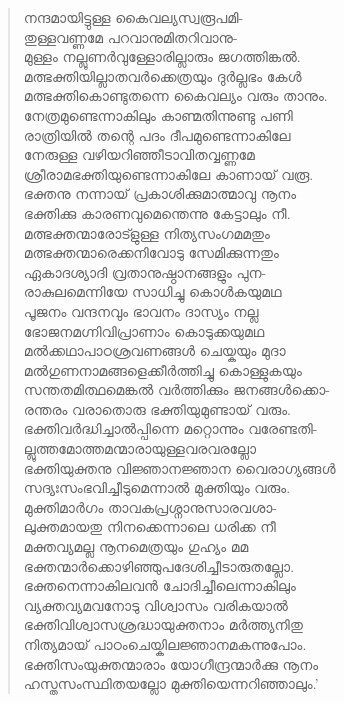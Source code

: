 \begin{verse}
നന്ദമായിട്ടുള്ള കൈവല്യസ്വരൂപമി-\\
തുള്ളവണ്ണമേ പറവാനുമിതറിവാനു-\\
മുള്ളം നല്ലുണര്‍വുള്ളോരില്ലാരും ജഗത്തിങ്കല്‍.\\
മത്ഭക്തിയില്ലാതവര്‍ക്കെത്രയും ദുര്‍ല്ലഭം കേള്‍\\
മത്ഭക്തികൊണ്ടുതന്നെ കൈവല്യം വരും താനും.\\
നേത്രമുണ്ടെന്നാകിലും കാണ്മതിന്നുണ്ടു പണി\\
രാത്രിയില്‍ തന്റെ പദം ദീപമുണ്ടെന്നാകിലേ\\
നേരുള്ള വഴിയറിഞ്ഞീടാവിതവ്വണ്ണമേ\\
ശ്രീരാമഭക്തിയുണ്ടെന്നാകിലേ കാണായ് വരൂ.\\
ഭക്തനു നന്നായ് പ്രകാശിക്കുമാത്മാവു നൂനം\\
ഭക്തിക്കു കാരണവുമെന്തെന്നു കേട്ടാലും നീ.\\
മത്ഭക്തന്മാരോട്ളുള്ള നിത്യസംഗമമതും\\
മത്ഭക്തന്മാരെക്കനിവോടു സേമിക്കുന്നതും\\
ഏകാദശ്യാദി വ്രതാനുഷ്ഠാനങ്ങളും പുന-\\
രാകുലമെന്നിയേ സാധിച്ചു കൊള്‍കയുമഥ\\
പൂജനം വന്ദനവും ഭാവനം ദാസ്യം നല്ല\\
ഭോജനമഗ്നിവിപ്രാണാം കൊടുക്കയുമഥ\\
മല്‍ക്കഥാപാഠശ്രവണങ്ങള്‍ ചെയ്കയും മുദാ\\
മല്‍ഗുണനാമങ്ങളെക്കീര്‍ത്തിച്ചു കൊള്ളുകയും\\
സന്തതമിത്ഥമെങ്കല്‍ വര്‍ത്തിക്കും ജനങ്ങള്‍ക്കൊ-\\
രന്തരം വരാതൊരു ഭക്തിയുമുണ്ടായ് വരും.\\
ഭക്തിവര്‍ദ്ധിച്ചാല്‍പ്പിന്നെ മറ്റൊന്നും വരേണ്ടതി-\\
ല്ലുത്തമോത്തമന്മാരായുള്ളവരവരല്ലോ\\
ഭക്തിയുക്തനു വിജ്ഞാനജ്ഞാന വൈരാഗ്യങ്ങള്‍\\
സദ്യഃസംഭവിച്ചീടുമെന്നാല്‍ മുക്തിയും വരും.\\
മുക്തിമാര്‍ഗം താവകപ്രശ്നാനുസാരവശാ-\\
ലുക്തമായതു നിനക്കെന്നാലെ ധരിക്ക നീ\\
മക്തവ്യമല്ല നൂനമെത്രയും ഗുഹ്യം മമ\\
ഭക്തന്മാര്‍ക്കൊഴിഞ്ഞുപദേശിച്ചീടാരുതല്ലോ.\\
ഭക്തനെന്നാകിലവന്‍ ചോദിച്ചീലെന്നാകിലും\\
വ്യക്തവ്യമവനോടു വിശ്വാസം വരികയാല്‍\\
ഭക്തിവിശ്വാസശ്രദ്ധായുക്തനാം മര്‍ത്ത്യനിതു\\
നിത്യമായ് പാഠംചെയ്കിലജ്ഞാനമകന്നുപോം.\\
ഭക്തിസംയുക്തന്മാരാം യോഗീന്ദ്രന്മാര്‍ക്കു നൂനം\\
ഹസ്തസംസ്ഥിതയല്ലോ മുക്തിയെന്നറിഞ്ഞാലും.’
\end{verse}

